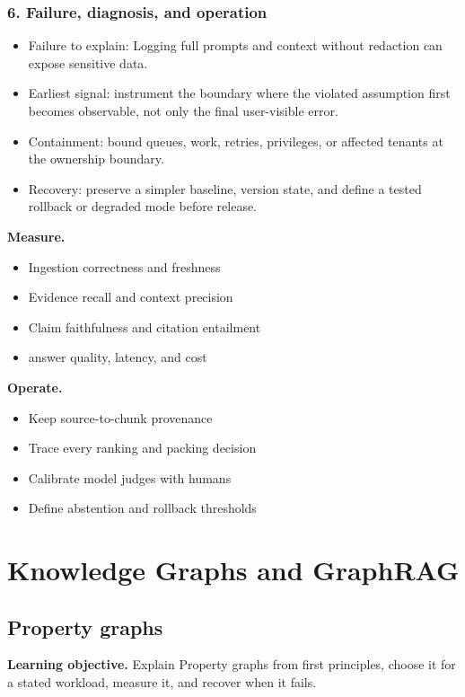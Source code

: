 \subsubsection*{6. Failure, diagnosis, and operation}
\begin{itemize}
\item Failure to explain: Logging full prompts and context without redaction can expose sensitive data.
\item Earliest signal: instrument the boundary where the violated assumption first becomes observable, not only the final user-visible error.
\item Containment: bound queues, work, retries, privileges, or affected tenants at the ownership boundary.
\item Recovery: preserve a simpler baseline, version state, and define a tested rollback or degraded mode before release.
\end{itemize}
\textbf{Measure.}\begin{itemize}
\item Ingestion correctness and freshness
\item Evidence recall and context precision
\item Claim faithfulness and citation entailment
\item answer quality, latency, and cost
\end{itemize}
\textbf{Operate.}\begin{itemize}
\item Keep source-to-chunk provenance
\item Trace every ranking and packing decision
\item Calibrate model judges with humans
\item Define abstention and rollback thresholds
\end{itemize}
\clearpage\section{Knowledge Graphs and GraphRAG}
\subsection{Property graphs}
\textbf{Learning objective.} Explain Property graphs from first principles, choose it for a stated workload, measure it, and recover when it fails.
